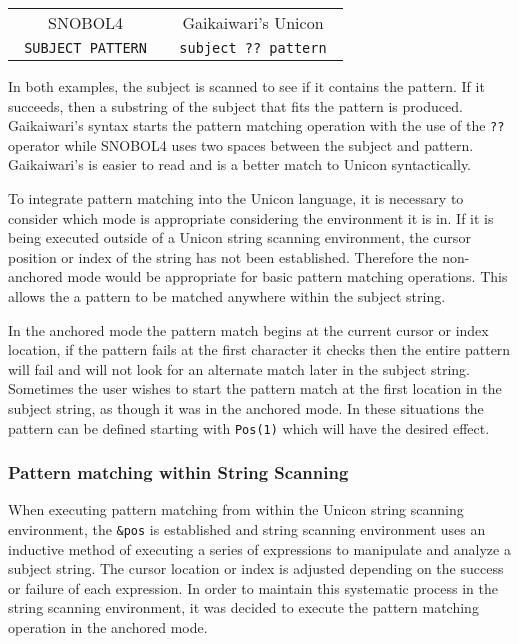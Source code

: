 \documentclass{article}
\begin{document}
\begin{table}[ht]
	\centering
	\begin{tabular}{c c}
		SNOBOL4 & Gaikaiwari's Unicon \\
		\texttt{ SUBJECT  PATTERN }& 
		
		\texttt{ subject ?? pattern }

	\end{tabular}
\end{table}
\noindent
In both examples, the subject is scanned to see if it contains the pattern.  If it succeeds, then a substring of the subject that fits the pattern is produced.  Gaikaiwari's syntax starts the pattern matching operation with the use of the \texttt{??} operator while SNOBOL4 uses two spaces between the subject and pattern.  Gaikaiwari's is easier to read and is a better match to Unicon syntactically.   

To integrate pattern matching into the Unicon language, it is necessary to consider which mode is appropriate considering the environment it is in.  If it is being executed outside of a Unicon string scanning environment, the cursor position or index of the string has not been established.  Therefore the non-anchored mode would be appropriate for basic pattern matching operations.  This allows the a pattern to be matched anywhere within the subject string.  

In the anchored mode the pattern match begins at the current cursor or index location, if the pattern fails at the first character it checks then the entire pattern will fail and will not look for an alternate match later in the subject string.  Sometimes the user wishes to start the pattern match at the first location in the subject string, as though it was in the anchored mode.  In these situations the pattern can be defined starting with \texttt{Pos(1)} which will have the desired effect.

\subsubsection{Pattern matching within String Scanning}
When executing pattern matching from within the Unicon string scanning environment, the \texttt{\&pos} is established and string scanning environment uses an inductive method of executing a series of expressions to manipulate and analyze a subject string.  The cursor location or index is adjusted depending on the success or failure of each expression.  In order to maintain this systematic process in the string scanning environment, it was decided to execute the pattern matching operation in the anchored mode.  
\end{document}
